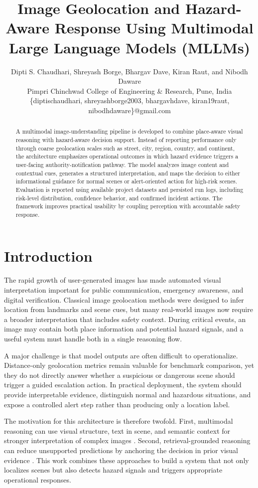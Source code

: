 \documentclass[12pt,a4paper]{article}
\title{Image Geolocation and Hazard-Aware Response Using Multimodal Large Language Models (MLLMs)}
\author{
Dipti S. Chaudhari, Shreyash Borge, Bhargav Dave, Kiran Raut, and Nibodh Daware\\
Pimpri Chinchwad College of Engineering \& Research, Pune, India\\
\{diptischaudhari, shreyashborge2003, bhargavhdave, kiran19raut, nibodhdaware\}@gmail.com
}
\begin{document}
\maketitle

\begin{abstract}
A multimodal image-understanding pipeline is developed to combine place-aware visual reasoning with hazard-aware decision support. Instead of reporting performance only through coarse geolocation scales such as street, city, region, country, and continent, the architecture emphasizes operational outcomes in which hazard evidence triggers a user-facing authority-notification pathway. The model analyzes image content and contextual cues, generates a structured interpretation, and maps the decision to either informational guidance for normal scenes or alert-oriented action for high-risk scenes. Evaluation is reported using available project datasets and persisted run logs, including risk-level distribution, confidence behavior, and confirmed incident actions. The framework improves practical usability by coupling perception with accountable safety response.
\end{abstract}

\section{Introduction}
The rapid growth of user-generated images has made automated visual interpretation important for public communication, emergency awareness, and digital verification. Classical image geolocation methods were designed to infer location from landmarks and scene cues, but many real-world images now require a broader interpretation that includes safety context. During critical events, an image may contain both place information and potential hazard signals, and a useful system must handle both in a single reasoning flow.

A major challenge is that model outputs are often difficult to operationalize. Distance-only geolocation metrics remain valuable for benchmark comparison, yet they do not directly answer whether a suspicious or dangerous scene should trigger a guided escalation action. In practical deployment, the system should provide interpretable evidence, distinguish normal and hazardous situations, and expose a controlled alert step rather than producing only a location label.

The motivation for this architecture is therefore twofold. First, multimodal reasoning can use visual structure, text in scene, and semantic context for stronger interpretation of complex images \cite{sinski2024improving, radford2021clip}. Second, retrieval-grounded reasoning can reduce unsupported predictions by anchoring the decision in prior visual evidence \cite{li2025pixels, zhou2024img2loc}. This work combines these approaches to build a system that not only localizes scenes but also detects hazard signals and triggers appropriate operational responses.
\end{document}
